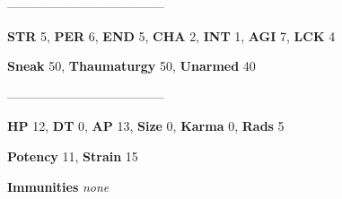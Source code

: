 \documentclass[11pt,a4paper,twocolumn]{book}
\begin{document}
%		
%	
%		

	--------------------------------------

	\noindent
	\textbf{STR} 5, \textbf{PER} 6, \textbf{END} 5, \textbf{CHA} 2, \textbf{INT} 1, \textbf{AGI} 7, \textbf{LCK} 4
	
	\noindent
	\textbf{Sneak} 50, \textbf{Thaumaturgy} 50, \textbf{Unarmed} 40
	
	--------------------------------------
	
	\noindent
	\textbf{HP} 12, \textbf{DT} 0, \textbf{AP} 13, \textbf{Size} 0, \textbf{Karma} 0, \textbf{Rads} 5
	
	\noindent
	\textbf{Potency} 11, \textbf{Strain} 15
	
	\noindent
	\textbf{Immunities} \emph{none}
	
\end{document}

